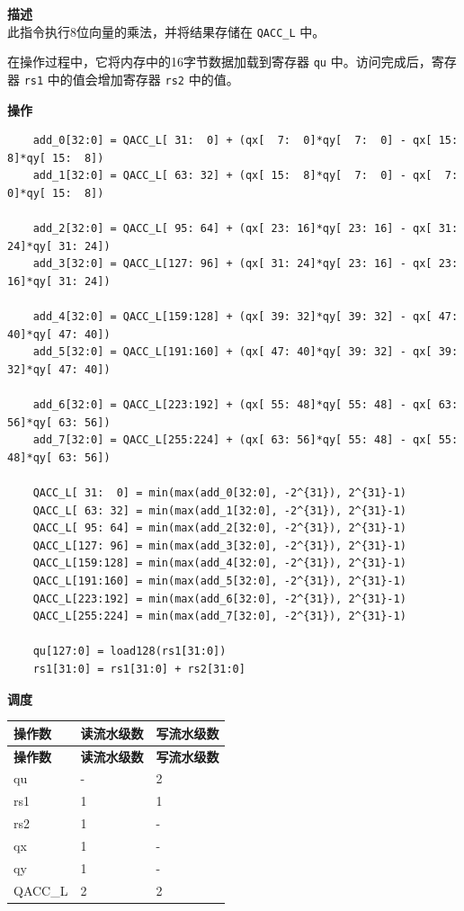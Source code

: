 \textbf{描述}\\
此指令执行8位向量的乘法，并将结果存储在 \lstinline{QACC_L} 中。

在操作过程中，它将内存中的16字节数据加载到寄存器 \lstinline{qu} 中。访问完成后，寄存器 \lstinline{rs1} 中的值会增加寄存器 \lstinline{rs2} 中的值。


\textbf{操作}\\
\begin{lstlisting}
    add_0[32:0] = QACC_L[ 31:  0] + (qx[  7:  0]*qy[  7:  0] - qx[ 15:  8]*qy[ 15:  8])
    add_1[32:0] = QACC_L[ 63: 32] + (qx[ 15:  8]*qy[  7:  0] - qx[  7:  0]*qy[ 15:  8])

    add_2[32:0] = QACC_L[ 95: 64] + (qx[ 23: 16]*qy[ 23: 16] - qx[ 31: 24]*qy[ 31: 24])
    add_3[32:0] = QACC_L[127: 96] + (qx[ 31: 24]*qy[ 23: 16] - qx[ 23: 16]*qy[ 31: 24])

    add_4[32:0] = QACC_L[159:128] + (qx[ 39: 32]*qy[ 39: 32] - qx[ 47: 40]*qy[ 47: 40])
    add_5[32:0] = QACC_L[191:160] + (qx[ 47: 40]*qy[ 39: 32] - qx[ 39: 32]*qy[ 47: 40])

    add_6[32:0] = QACC_L[223:192] + (qx[ 55: 48]*qy[ 55: 48] - qx[ 63: 56]*qy[ 63: 56])
    add_7[32:0] = QACC_L[255:224] + (qx[ 63: 56]*qy[ 55: 48] - qx[ 55: 48]*qy[ 63: 56])

    QACC_L[ 31:  0] = min(max(add_0[32:0], -2^{31}), 2^{31}-1)
    QACC_L[ 63: 32] = min(max(add_1[32:0], -2^{31}), 2^{31}-1)
    QACC_L[ 95: 64] = min(max(add_2[32:0], -2^{31}), 2^{31}-1)
    QACC_L[127: 96] = min(max(add_3[32:0], -2^{31}), 2^{31}-1)
    QACC_L[159:128] = min(max(add_4[32:0], -2^{31}), 2^{31}-1)
    QACC_L[191:160] = min(max(add_5[32:0], -2^{31}), 2^{31}-1)
    QACC_L[223:192] = min(max(add_6[32:0], -2^{31}), 2^{31}-1)
    QACC_L[255:224] = min(max(add_7[32:0], -2^{31}), 2^{31}-1)

    qu[127:0] = load128(rs1[31:0])
    rs1[31:0] = rs1[31:0] + rs2[31:0]
\end{lstlisting}

\textbf{调度}\\
\begin{longtable}[c]{|l|l|l|}
    \hline
    \rowcolor{lightgray}
    \textbf{操作数} & \textbf{读流水级数} & \textbf{写流水级数} \\\hline
    \endfirsthead
    \hline
    \rowcolor{lightgray}
     \textbf{操作数} & \textbf{读流水级数} & \textbf{写流水级数} \\\hline
    \endhead
    \hline
    \endfoot

    qu & - & 2 \\\hline
    rs1 & 1 & 1 \\\hline
    rs2 & 1 & - \\\hline
     qx & 1 & - \\\hline
     qy & 1 & - \\\hline
     QACC\_L & 2 & 2

\end{longtable}

